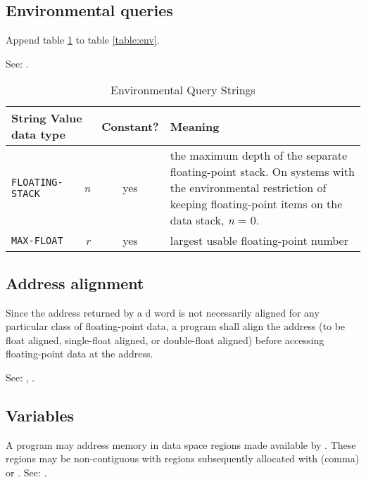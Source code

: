 \subsection{Environmental queries} %

Append table \ref{float:env} to table \ref{table:env}.

See: .

\begin{table}[ht]
  \begin{center}
	\caption{Environmental Query Strings}
	\label{float:env}
	\begin{tabular}{p{9em}rcp{}}
		\hline\hline
		\multicolumn{2}{l}{String \hfill Value data type} & Constant? & Meaning \\
		\hline
		\texttt{FLOATING-STACK} & \emph{n} & yes &
			the maximum depth of the separate floating-point stack.
			On systems with the environmental restriction of keeping
			floating-point items on the data stack, \emph{n} = 0. \\
		\texttt{MAX-FLOAT}		& \emph{r}			& yes	&
			largest usable floating-point number \\
		\hline\hline
	\end{tabular}
  \end{center}
\end{table}


\subsection{Address alignment} %

Since the address returned by a d word is not
necessarily aligned for any particular class of floating-point
data, a program shall align the address (to be float aligned,
single-float aligned, or double-float aligned) before accessing
floating-point data at the address.

See: ,
	.

\subsection{Variables} %

A program may address memory in data space regions made available
by . These regions may be non-contiguous with
regions subsequently allocated with \word[core]{,} (comma) or
. See: .


